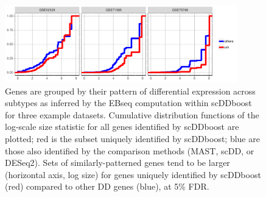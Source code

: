 \documentclass[aoas,preprint]{imsart}
\begin{document}
\begin{figure}[H]
\includegraphics[width = 0.9\textwidth]{Figs/shift.pdf}
 \caption{
 Genes are grouped by their pattern of differential expression across subtypes as inferred by
the EBseq computation within scDDboost for three example datasets.
 Cumulative distribution
functions of the log-scale size statistic for all genes 
 identified by scDDboost are plotted; red is the subset uniquely identified by scDDboost; blue are those also identified by the comparison methods (MAST, scDD, or DESeq2).
 Sets of similarly-patterned genes tend to be larger (horizontal axis, log size) for genes uniquely
 identified by scDDboost (red) compared to other DD genes (blue), at 5\% FDR.}
  \label{fig:shift}
\end{figure}



\end{document}
